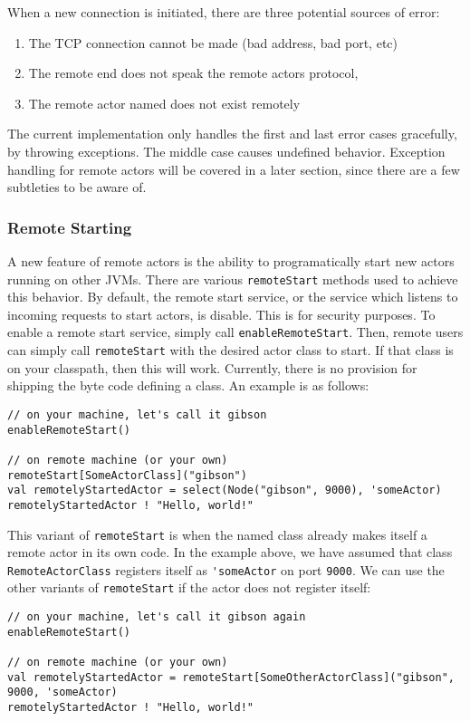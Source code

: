 \documentclass{article}
\begin{document}
When a new connection is initiated, there are three potential sources of error:
\begin{enumerate}
  \item The TCP connection cannot be made (bad address, bad port, etc)
  \item The remote end does not speak the remote actors protocol, 
  \item The remote actor named does not exist remotely
\end{enumerate}
The current implementation only handles the first and last error cases gracefully, by 
throwing exceptions. The middle case causes undefined behavior.
Exception handling for remote actors will be covered in a later section, 
since there are a few subtleties to be aware of.

\subsubsection{Remote Starting}
A new feature of remote actors is the ability to programatically start new actors
running on other JVMs. There are various \verb|remoteStart| methods used to 
achieve this behavior. By default, the remote start service, or the service
which listens to incoming requests to start actors, is disable. This is for
security purposes. To enable a remote start service, simply call 
\verb|enableRemoteStart|. Then, remote users can simply call \verb|remoteStart|
with the desired actor class to start. If that class is on your classpath, then
this will work. Currently, there is no provision for shipping the byte code defining
a class. An example is as follows:
\begin{verbatim}
// on your machine, let's call it gibson
enableRemoteStart()

// on remote machine (or your own)
remoteStart[SomeActorClass]("gibson")
val remotelyStartedActor = select(Node("gibson", 9000), 'someActor)
remotelyStartedActor ! "Hello, world!"
\end{verbatim}
This variant of \verb|remoteStart| is when the named class already makes itself
a remote actor in its own code. In the example above, we have assumed that
class \verb|RemoteActorClass| registers itself as \verb|'someActor| on port 
\verb|9000|. We can use the other variants of \verb|remoteStart| if the
actor does not register itself:
\begin{verbatim}
// on your machine, let's call it gibson again
enableRemoteStart()

// on remote machine (or your own)
val remotelyStartedActor = remoteStart[SomeOtherActorClass]("gibson", 9000, 'someActor)
remotelyStartedActor ! "Hello, world!"
\end{verbatim}
\end{document}
